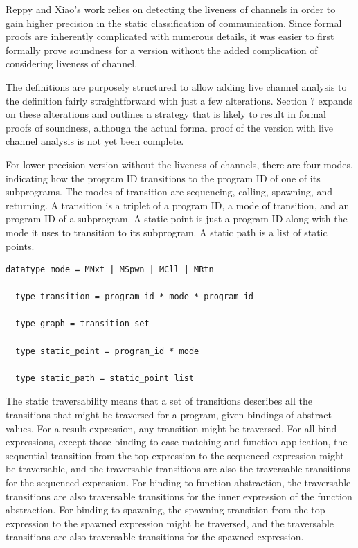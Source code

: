 \documentclass[10pt]{article}
\begin{document}
Reppy and Xiao's work relies on detecting the liveness of channels in order to gain higher
precision in the static classification of communication. Since formal proofs are inherently
complicated with numerous details, it was easier to first formally prove soundness for a
version without the added complication of considering liveness of channel.

The definitions are purposely structured to allow adding live channel analysis to the
definition fairly straightforward with just a few alterations.  Section ? expands on
these alterations and outlines a strategy that is likely to result in formal proofs of
soundness, although the actual formal proof of the version with live channel analysis is
not yet been complete.  

For lower precision version without the liveness of channels, there are four modes,
indicating how the program ID transitions to the program ID of one of
its subprograms.
The modes of transition are sequencing, calling, spawning, and returning. A transition is a
triplet of a program ID, a mode of transition, and an program ID of a
subprogram. A static point is just a program ID along with the mode it uses to
transition to its subprogram. A static path is a list of static points.  

\begin{lstlisting}[language=logic, mathescape]
  datatype mode = MNxt | MSpwn | MCll | MRtn

  type transition = program_id * mode * program_id

  type graph = transition set

  type static_point = program_id * mode

  type static_path = static_point list
  \end{lstlisting}

The static traversability means that a set of transitions describes all the transitions
that might be traversed for a program, given bindings of abstract values.  For a result
expression, any transition might be traversed.  For all bind expressions, except those binding
to case matching and function application, the sequential transition from the top expression to
the sequenced expression might be traversable, and the traversable transitions are also the
traversable transitions for the sequenced expression.  For binding to function abstraction, the
traversable transitions are also traversable transitions for the inner expression of the
function abstraction.  For binding to spawning, the spawning transition from the top expression
to the spawned expression might be traversed, and the traversable transitions are also
traversable transitions for the spawned expression.
\end{document}

